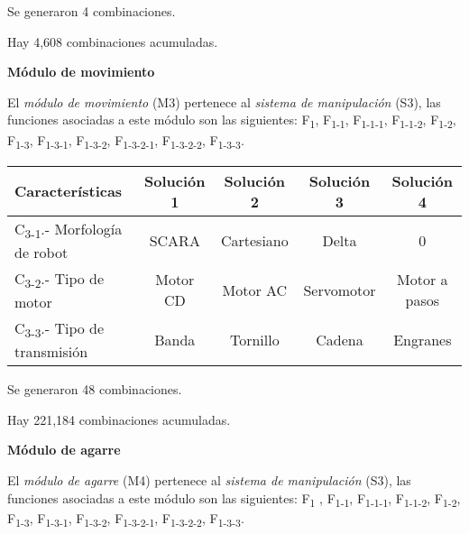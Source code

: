 Se generaron 4 combinaciones.\par
\par Hay 4,608 combinaciones acumuladas.

\textbf{M\'odulo de movimiento}

El \textit{m\'odulo de movimiento} (M3) pertenece al \textit{sistema de manipulaci\'on} (S3), las funciones asociadas a este m\'odulo son las siguientes: F\textsubscript{1}, F\textsubscript{1-1}, F\textsubscript{1-1-1}, F\textsubscript{1-1-2}, F\textsubscript{1-2}, F\textsubscript{1-3}, F\textsubscript{1-3-1}, F\textsubscript{1-3-2}, F\textsubscript{1-3-2-1}, F\textsubscript{1-3-2-2}, F\textsubscript{1-3-3}.


\begin{center}
\begin{adjustbox}{angle=90}
\begin{tabular}{|l|c|c|c|c|}
\hline
\textbf{Caracter\'isticas} &
 \textbf{Soluci\'on 1} &
 \textbf{Soluci\'on 2} &
 \textbf{Soluci\'on 3} &
 \textbf{Soluci\'on 4}\\\hline
C\textsubscript{3-1}.- Morfolog\'ia de robot &
 SCARA &
 Cartesiano &
 Delta &
 0 \\\hline
C\textsubscript{3-2}.- Tipo de motor &
 Motor CD &
 Motor AC &
 Servomotor &
 Motor a pasos\\\hline
C\textsubscript{3-3}.- Tipo de transmisi\'on &
 Banda &
 Tornillo &
 Cadena &
 Engranes\\\hline
\end{tabular}

\end{adjustbox}
\end{center}

Se generaron 48 combinaciones.\par
\par Hay 221,184 combinaciones acumuladas.

\textbf{M\'odulo de agarre}

El \textit{m\'odulo de agarre} (M4) pertenece al \textit{sistema de manipulaci\'on} (S3), las funciones asociadas a este m\'odulo son las siguientes: F\textsubscript{1}
, F\textsubscript{1-1}, F\textsubscript{1-1-1}, F\textsubscript{1-1-2}, F\textsubscript{1-2}, F\textsubscript{1-3}, F\textsubscript{1-3-1}, F\textsubscript{1-3-2}, F\textsubscript{1-3-2-1}, F\textsubscript{1-3-2-2}, F\textsubscript{1-3-3}.



